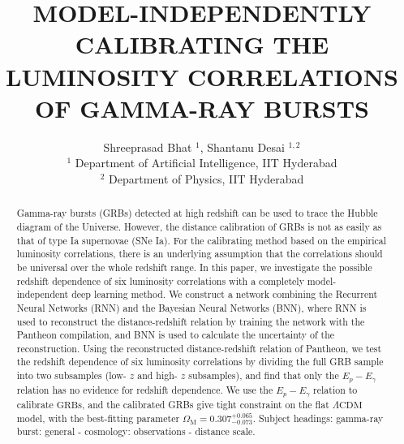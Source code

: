 \documentclass[10pt, a4paper]{article}
\title{MODEL-INDEPENDENTLY CALIBRATING THE LUMINOSITY CORRELATIONS OF GAMMA-RAY BURSTS\\}
\author{Shreeprasad Bhat $^{1}$, Shantanu Desai $^{1,2}$\\
${ }^{1}$ Department of Artificial Intelligence, IIT Hyderabad\\
${ }^{2}$ Department of Physics, IIT Hyderabad}
\begin{document}
\maketitle
\begin{abstract}
Gamma-ray bursts (GRBs) detected at high redshift can be used to trace the Hubble diagram of the Universe. However, the distance calibration of GRBs is not as easily as that of type Ia supernovae (SNe Ia). For the calibrating method based on the empirical luminosity correlations, there is an underlying assumption that the correlations should be universal over the whole redshift range. In this paper, we investigate the possible redshift dependence of six luminosity correlations with a completely model-independent deep learning method. We construct a network combining the Recurrent Neural Networks (RNN) and the Bayesian Neural Networks (BNN), where RNN is used to reconstruct the distance-redshift relation by training the network with the Pantheon compilation, and BNN is used to calculate the uncertainty of the reconstruction. Using the reconstructed distance-redshift relation of Pantheon, we test the redshift dependence of six luminosity correlations by dividing the full GRB sample into two subsamples (low- $z$ and high- $z$ subsamples), and find that only the $E_{p}-E_{\gamma}$ relation has no evidence for redshift dependence. We use the $E_{p}-E_{\gamma}$ relation to calibrate $\mathrm{GRBs}$, and the calibrated GRBs give tight constraint on the flat $\Lambda \mathrm{CDM}$ model, with the best-fitting parameter $\Omega_{\mathrm{M}}=0.307_{-0.073}^{+0.065}$. Subject headings: gamma-ray burst: general - cosmology: observations - distance scale.
\end{abstract}
\end{document}
